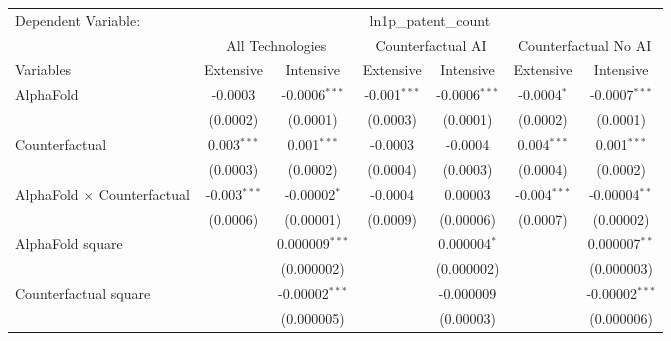 \begingroup
\centering
\begin{tabular}{lcccccc}
   \tabularnewline \midrule \midrule
   Dependent Variable: & \multicolumn{6}{c}{ln1p\_patent\_count}\\
 & \multicolumn{2}{c}{All Technologies} & \multicolumn{2}{c}{Counterfactual AI} & \multicolumn{2}{c}{Counterfactual No AI} \\
\cmidrule(lr){1-1}\cmidrule(lr){2-3} \cmidrule(lr){4-5} \cmidrule(lr){6-7}
Variables & \multicolumn{1}{c}{Extensive} & \multicolumn{1}{c}{Intensive} & \multicolumn{1}{c}{Extensive} & \multicolumn{1}{c}{Intensive} & \multicolumn{1}{c}{Extensive} & \multicolumn{1}{c}{Intensive} \\
\cmidrule(lr){1-1}\cmidrule(lr){2-2} \cmidrule(lr){3-3} \cmidrule(lr){4-4} \cmidrule(lr){5-5} \cmidrule(lr){6-6} \cmidrule(lr){7-7}
   AlphaFold                          & -0.0003        & -0.0006$^{***}$   & -0.001$^{***}$ & -0.0006$^{***}$ & -0.0004$^{*}$  & -0.0007$^{***}$\\   
                                      & (0.0002)       & (0.0001)          & (0.0003)       & (0.0001)        & (0.0002)       & (0.0001)\\   
   Counterfactual                     & 0.003$^{***}$  & 0.001$^{***}$     & -0.0003        & -0.0004         & 0.004$^{***}$  & 0.001$^{***}$\\   
                                      & (0.0003)       & (0.0002)          & (0.0004)       & (0.0003)        & (0.0004)       & (0.0002)\\   
   AlphaFold $\times$ Counterfactual  & -0.003$^{***}$ & -0.00002$^{*}$    & -0.0004        & 0.00003         & -0.004$^{***}$ & -0.00004$^{**}$\\   
                                      & (0.0006)       & (0.00001)         & (0.0009)       & (0.00006)       & (0.0007)       & (0.00002)\\   
   AlphaFold square                   &                & 0.000009$^{***}$  &                & 0.000004$^{*}$  &                & 0.000007$^{**}$\\   
                                      &                & (0.000002)        &                & (0.000002)      &                & (0.000003)\\   
   Counterfactual square              &                & -0.00002$^{***}$  &                & -0.000009       &                & -0.00002$^{***}$\\   
                                      &                & (0.000005)        &                & (0.00003)       &                & (0.000006)\\   

\end{tabular}
